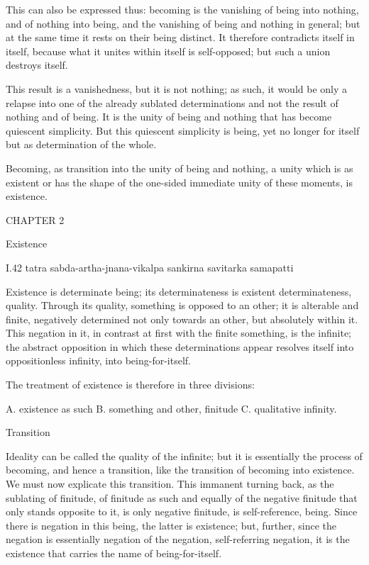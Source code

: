 This can also be expressed thus:
becoming is the vanishing of being into nothing,
and of nothing into being,
and the vanishing of being and nothing in general;
but at the same time it rests on their being distinct.
It therefore contradicts itself in itself,
because what it unites within itself is self-opposed;
but such a union destroys itself.

This result is a vanishedness, but it is not nothing;
as such, it would be only a relapse into one of
the already sublated determinations
and not the result of nothing and of being.
It is the unity of being and nothing
that has become quiescent simplicity.
But this quiescent simplicity is being,
yet no longer for itself but as determination of the whole.

Becoming, as transition into
the unity of being and nothing,
a unity which is as existent
or has the shape of the one-sided
immediate unity of these moments,
is existence.

CHAPTER 2

Existence

I.42
tatra sabda-artha-jnana-vikalpa sankirna savitarka samapatti

Existence is determinate being;
its determinateness is existent determinateness, quality.
Through its quality, something is opposed to an other;
it is alterable and finite,
negatively determined not only towards an other,
but absolutely within it.
This negation in it,
in contrast at first
with the finite something,
is the infinite;
the abstract opposition
in which these determinations appear
resolves itself into oppositionless infinity,
into being-for-itself.

The treatment of existence is therefore in three divisions:

A. existence as such
B. something and other, finitude
C. qualitative infinity.

Transition

Ideality can be called the
quality of the infinite;
but it is essentially
the process of becoming,
and hence a transition,
like the transition
of becoming into existence.
We must now explicate this transition.
This immanent turning back,
as the sublating of finitude,
of finitude as such
and equally of the negative finitude
that only stands opposite to it,
is only negative finitude,
is self-reference, being.
Since there is negation
in this being,
the latter is existence;
but, further, since the
negation is essentially
negation of the negation,
self-referring negation,
it is the existence that
carries the name of
being-for-itself.

